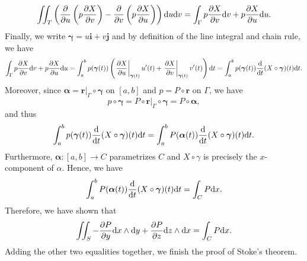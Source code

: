 \begin{proofenv}
    $$ \iint_T \left( \pdv{u} \left( p \pdv{X}{v} \right) - \pdv{v} \left( p \pdv{X}{u} \right) \right) \dd u \dd v = \int_\Gamma p \pdv{X}{v} \dd v + p \pdv{X}{u} \dd u. $$
    Finally, we write $\bm \gamma = u \bm i + v \bm j$ and by definition of the line integral and chain rule, we have
    $$
    \int_\Gamma p \pdv{X}{v} \dd v + p \pdv{X}{u} \dd u = \int_a^b p(\bm \gamma (t)) \left( \left. \pdv{X}{u}\right|_{\bm \gamma(t)} u'(t) + \left. \pdv{X}{v}\right|_{\bm \gamma(t)} v'(t) \right) \dd t = \int_a^b p(\bm \gamma(t)) \dv{t} (X\circ \bm \gamma)(t) \dd t.
    $$
    Moreover, since $\bm \alpha = \bm r\big|_\Gamma \circ \bm \gamma$ on $[a,b]$ and $p = P \circ \bm r$ on $\Gamma$, we have
    $$ p \circ \bm \gamma = P \circ \bm r\big|_\Gamma \circ \bm \gamma = P \circ \bm \alpha, $$
    and thus
    $$
    \int_a^b p(\bm \gamma(t)) \dv{t} (X\circ \bm \gamma)(t) \dd t = \int_a^b P(\bm \alpha(t)) \dv{t} (X\circ \bm \gamma)(t) \dd t.
    $$
    Furthermore, $\bm \alpha : [a,b] \to C$ parametrizes $C$ and $X\circ \gamma$ is precisely the $x$-component of $\alpha$. Hence, we have
    $$ \int_a^b P(\bm \alpha(t)) \dv{t} (X\circ \bm \gamma)(t) \dd t = \int_C P \dd x. $$
    Therefore, we have shown that
    $$ \iint_S -\pdv{P}{y} \dd x \wedge \dd y + \pdv{P}{z} \dd z \wedge \dd x = \int_C P \dd x. $$
    Adding the other two equalities together, we finish the proof of Stoke's theorem.
\end{proofenv}
